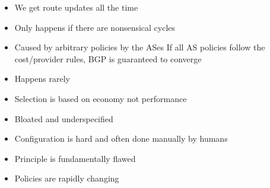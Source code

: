 \begin{itemize}
\begin{itemize}
\begin{itemize}
\begin{itemize}
                            \item We get route updates all the time
                            \item Only happens if there are nonsensical cycles
                            \item Caused by arbitrary policies by the ASes
                                 If all AS policies follow the cost/provider rules, BGP is guaranteed to converge
                            \item Happens rarely
                        \end{itemize}
                        \begin{itemize}
                            \item Selection is based on economy not performance
                        \end{itemize}
                        \begin{itemize}
                            \item Bloated and underspecified
                            \item Configuration is hard and often done manually by humans
                            \item Principle is fundamentally flawed
                        \end{itemize}
                        \begin{itemize}
                            \item Policies are rapidly changing
                        \end{itemize}
                \end{itemize}
        \end{itemize}
\end{itemize}
